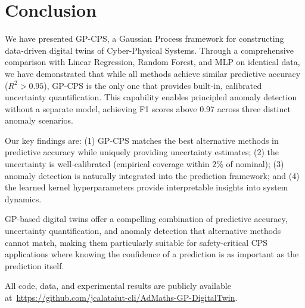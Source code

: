 \documentclass[conference]{IEEEtran}
\begin{document}
\section{Conclusion}
\label{sec:conclusion}

We have presented GP-CPS, a Gaussian Process framework for constructing data-driven digital twins of Cyber-Physical Systems. Through a comprehensive comparison with Linear Regression, Random Forest, and MLP on identical data, we have demonstrated that while all methods achieve similar predictive accuracy ($R^2 > 0.95$), GP-CPS is the only one that provides built-in, calibrated uncertainty quantification. This capability enables principled anomaly detection without a separate model, achieving F1 scores above 0.97 across three distinct anomaly scenarios.

Our key findings are: (1) GP-CPS matches the best alternative methods in predictive accuracy while uniquely providing uncertainty estimates; (2) the uncertainty is well-calibrated (empirical coverage within 2\% of nominal); (3) anomaly detection is naturally integrated into the prediction framework; and (4) the learned kernel hyperparameters provide interpretable insights into system dynamics.

GP-based digital twins offer a compelling combination of predictive accuracy, uncertainty quantification, and anomaly detection that alternative methods cannot match, making them particularly suitable for safety-critical CPS applications where knowing the confidence of a prediction is as important as the prediction itself.

All code, data, and experimental results are publicly available at~\url{https://github.com/jcalataiut-cli/AdMaths-GP-DigitalTwin}.
\end{document}
